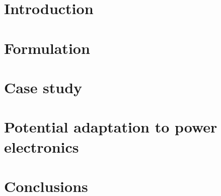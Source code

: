 \documentclass[10pt, a4paper]{report}
\begin{document}
\tableofcontents{}

\chapter{Introduction}


\chapter{Formulation}


\chapter{Case study}


\chapter{Potential adaptation to power electronics}

\chapter{Conclusions}


\printbibliography
\end{document}

